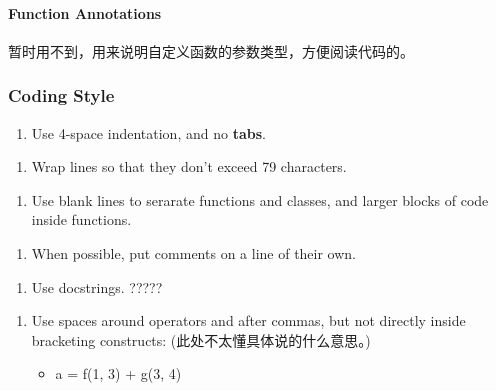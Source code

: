 \documentclass[11pt]{article}
\providecommand{\tightlist}{%
      \setlength{\itemsep}{0pt}\setlength{\parskip}{0pt}}
\begin{document}
    \paragraph{Function Annotations}\label{function-annotations}

    暂时用不到，用来说明自定义函数的参数类型，方便阅读代码的。

    \subsubsection{Coding Style}\label{coding-style}

    \begin{enumerate}
\def\labelenumi{\arabic{enumi}.}
\tightlist
\item
  Use 4-space indentation, and no \textbf{tabs}.
\end{enumerate}

    \begin{enumerate}
\def\labelenumi{\arabic{enumi}.}
\setcounter{enumi}{1}
\tightlist
\item
  Wrap lines so that they don't exceed 79 characters.
\end{enumerate}

    \begin{enumerate}
\def\labelenumi{\arabic{enumi}.}
\setcounter{enumi}{2}
\tightlist
\item
  Use blank lines to serarate functions and classes, and larger blocks
  of code inside functions.
\end{enumerate}

    \begin{enumerate}
\def\labelenumi{\arabic{enumi}.}
\setcounter{enumi}{3}
\tightlist
\item
  When possible, put comments on a line of their own.
\end{enumerate}

    \begin{enumerate}
\def\labelenumi{\arabic{enumi}.}
\setcounter{enumi}{4}
\tightlist
\item
  Use docstrings. ?????
\end{enumerate}

    \begin{enumerate}
\def\labelenumi{\arabic{enumi}.}
\setcounter{enumi}{5}
\item
  Use spaces around operators and after commas, but not directly inside
  bracketing constructs: (此处不太懂具体说的什么意思。)

  \begin{itemize}
  \tightlist
  \item
    a = f(1, 3) + g(3, 4)
  \end{itemize}
\end{enumerate}
\end{document}
